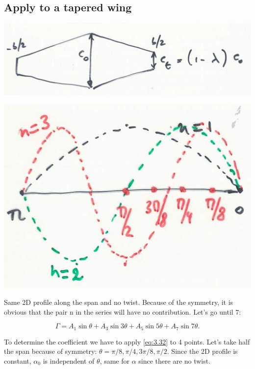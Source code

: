 \documentclass[british,french,11pt, a4paper, openany]{article}
\begin{document}
\subsection{Apply to a tapered wing}
\begin{center}
	\begin{minipage}{0.4\textwidth}
		\includegraphics[scale=0.05]{ch3/21}
		\label{fig:3.21}
	\end{minipage}
	\begin{minipage}{0.22\textwidth}
		\includegraphics[scale=0.02]{ch3/22}
		\label{fig:3.22}
	\end{minipage}
\end{center}

Same 2D profile along the span and no twist. Because of the symmetry, it is obvious that the pair n in the series will have no contribution. Let's go until 7:

\begin{equation}
\Gamma = A_1\sin \theta + A_3\sin 3\theta + A_5\sin 5\theta + A_7\sin 7\theta.
\end{equation}

To determine the coefficient we have to apply \eqref{eq:3.32} to 4 points. Let's take half the span because of symmetry: $\theta = \pi /8, \pi /4, 3\pi /8, \pi /2$. Since the 2D profile is constant, $\alpha _0$ is independent of $\theta$, same for $\alpha$ since there are no twist. 
\end{document}
